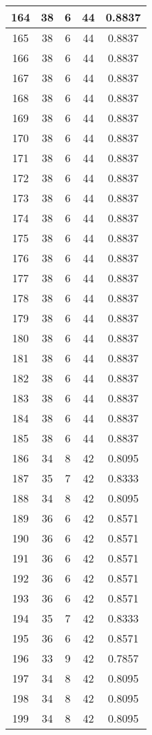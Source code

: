\documentclass[letterpaper, 12pt]{article}
\begin{document}
\begin{longtable}{|c|c|c|c|c|}
\hline
164 & 38 & 6 & 44 & 0.8837 \\
\hline
165 & 38 & 6 & 44 & 0.8837 \\
\hline
166 & 38 & 6 & 44 & 0.8837 \\
\hline
167 & 38 & 6 & 44 & 0.8837 \\
\hline
168 & 38 & 6 & 44 & 0.8837 \\
\hline
169 & 38 & 6 & 44 & 0.8837 \\
\hline
170 & 38 & 6 & 44 & 0.8837 \\
\hline
171 & 38 & 6 & 44 & 0.8837 \\
\hline
172 & 38 & 6 & 44 & 0.8837 \\
\hline
173 & 38 & 6 & 44 & 0.8837 \\
\hline
174 & 38 & 6 & 44 & 0.8837 \\
\hline
175 & 38 & 6 & 44 & 0.8837 \\
\hline
176 & 38 & 6 & 44 & 0.8837 \\
\hline
177 & 38 & 6 & 44 & 0.8837 \\
\hline
178 & 38 & 6 & 44 & 0.8837 \\
\hline
179 & 38 & 6 & 44 & 0.8837 \\
\hline
180 & 38 & 6 & 44 & 0.8837 \\
\hline
181 & 38 & 6 & 44 & 0.8837 \\
\hline
182 & 38 & 6 & 44 & 0.8837 \\
\hline
183 & 38 & 6 & 44 & 0.8837 \\
\hline
184 & 38 & 6 & 44 & 0.8837 \\
\hline
185 & 38 & 6 & 44 & 0.8837 \\
\hline
186 & 34 & 8 & 42 & 0.8095 \\
\hline
187 & 35 & 7 & 42 & 0.8333 \\
\hline
188 & 34 & 8 & 42 & 0.8095 \\
\hline
189 & 36 & 6 & 42 & 0.8571 \\
\hline
190 & 36 & 6 & 42 & 0.8571 \\
\hline
191 & 36 & 6 & 42 & 0.8571 \\
\hline
192 & 36 & 6 & 42 & 0.8571 \\
\hline
193 & 36 & 6 & 42 & 0.8571 \\
\hline
194 & 35 & 7 & 42 & 0.8333 \\
\hline
195 & 36 & 6 & 42 & 0.8571 \\
\hline
196 & 33 & 9 & 42 & 0.7857 \\
\hline
197 & 34 & 8 & 42 & 0.8095 \\
\hline
198 & 34 & 8 & 42 & 0.8095 \\
\hline
199 & 34 & 8 & 42 & 0.8095 \\
\hline
\end{longtable}
\end{document}
